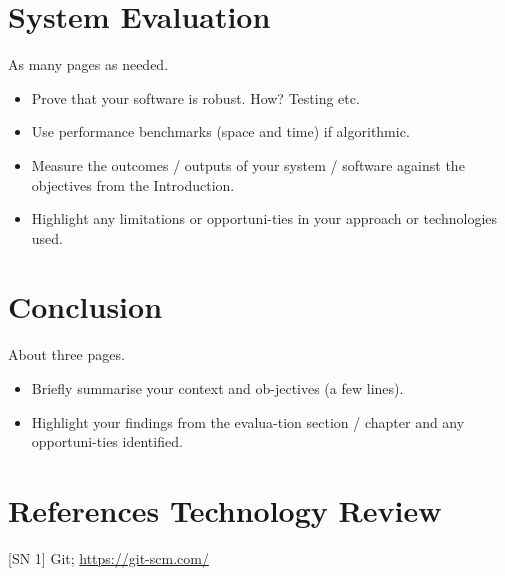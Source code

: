 \chapter{System Evaluation}
As many pages as needed.
\begin{itemize}
\item Prove that your software is robust. How? Testing etc. 
\item Use performance benchmarks (space and time) if algorithmic.
\item Measure the outcomes / outputs of your system / software against the objectives from the Introduction.
\item Highlight any limitations or opportuni-ties in your approach or technologies used.
\end{itemize}

\chapter{Conclusion}
About three pages.

\begin{itemize}
\item Briefly summarise your context and ob-jectives (a few lines).
\item Highlight your findings from the evalua-tion section / chapter and any opportuni-ties identified.
\end{itemize}

\chapter{References Technology Review}
[SN 1] Git; \url{https://git-scm.com/}




